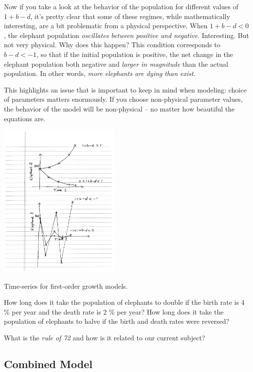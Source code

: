 Now if you take a look at the behavior of the population for different values of $1+b-d$, it's pretty clear that some of these regimes, while mathematically interesting, are a bit problematic from a physical perspective.   When $1+b-d<0$, the elephant population {\it oscillates between positive and negative}.  Interesting.  But not very physical.  Why does this happen?  This condition corresponds to $b-d<-1$, so that if the initial population is positive, the net change in the elephant population both negative and {\it larger in magnitude} than the actual population.  In other words, {\it more elephants are dying than exist}.  

This highlights an issue that is important to keep in mind when modeling:  choice of parameters matters enormously.  If you choose non-physical parameter values, the behavior of the model will be non-physical -- no matter how beautiful the equations are.

\begin{marginfigure}
\includegraphics[width=6cm]{figs/first_order}
\caption{Time-series for first-order growth models. }
\end{marginfigure}


\begin{del}
How long does it take the population of elephants to double if the birth rate is 4 \% per year and the death rate is 2 \% per year? How long does it take the population of elephants to halve if the birth and death rates were reversed?
\end{del}

\begin{del}
What is the {\it rule of 72} and how is it related to our current subject?
\end{del}

\subsection{Combined Model}

